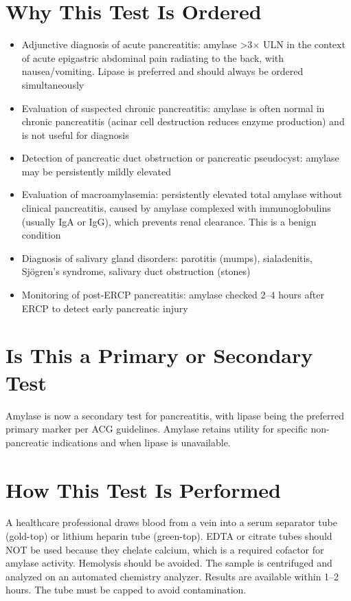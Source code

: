 \section*{Why This Test Is Ordered}
\begin{itemize}
  \item Adjunctive diagnosis of acute pancreatitis: amylase >3$\times$ ULN in the context of acute epigastric abdominal pain radiating to the back, with nausea/vomiting. Lipase is preferred and should always be ordered simultaneously
  \item Evaluation of suspected chronic pancreatitis: amylase is often normal in chronic pancreatitis (acinar cell destruction reduces enzyme production) and is not useful for diagnosis
  \item Detection of pancreatic duct obstruction or pancreatic pseudocyst: amylase may be persistently mildly elevated
  \item Evaluation of macroamylasemia: persistently elevated total amylase without clinical pancreatitis, caused by amylase complexed with immunoglobulins (usually IgA or IgG), which prevents renal clearance. This is a benign condition
  \item Diagnosis of salivary gland disorders: parotitis (mumps), sialadenitis, Sj\"{o}gren's syndrome, salivary duct obstruction (stones)
  \item Monitoring of post-ERCP pancreatitis: amylase checked 2--4 hours after ERCP to detect early pancreatic injury
\end{itemize}

\section*{Is This a Primary or Secondary Test}
Amylase is now a secondary test for pancreatitis, with lipase being the preferred primary marker per ACG guidelines. Amylase retains utility for specific non-pancreatic indications and when lipase is unavailable.

\section*{How This Test Is Performed}
A healthcare professional draws blood from a vein into a serum separator tube (gold-top) or lithium heparin tube (green-top). EDTA or citrate tubes should NOT be used because they chelate calcium, which is a required cofactor for amylase activity. Hemolysis should be avoided. The sample is centrifuged and analyzed on an automated chemistry analyzer. Results are available within 1--2 hours. The tube must be capped to avoid contamination.

